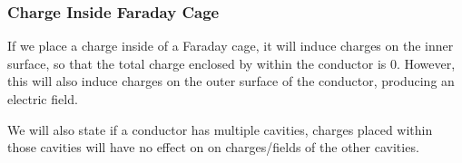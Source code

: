 \documentclass{book}
\begin{document}
\subsubsection{Charge Inside Faraday Cage}
If we place a charge inside of a Faraday cage, it will induce charges on the inner surface, so that the total charge enclosed by within the conductor is 0. However, this will also induce charges on the outer surface of the conductor, producing an electric field.
\begin{figure}[h]
        \centering
        \caption{}
        \label{fig:cond3}
    \end{figure}
We will also state if a conductor has multiple cavities, charges placed within those cavities will have no effect on on charges/fields of the other cavities.
\end{document}
